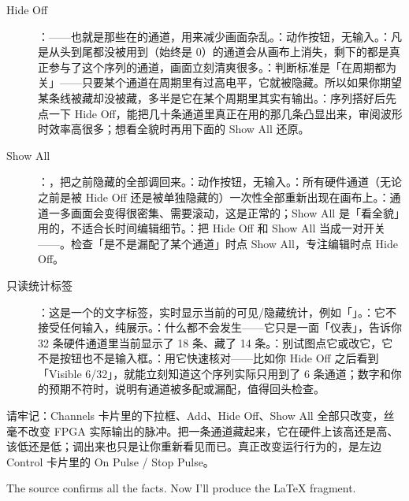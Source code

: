 \documentclass[11pt,oneside,openany]{book}
\begin{document}
\begin{description}
\item[Hide Off] ：——也就是那些在的通道，用来减少画面杂乱。：动作按钮，无输入。：凡是从头到尾都没被用到（始终是 0）的通道会从画布上消失，剩下的都是真正参与了这个序列的通道，画面立刻清爽很多。：判断标准是「在周期都为关」——只要某个通道在周期里有过高电平，它就被隐藏。所以如果你期望某条线被藏却没被藏，多半是它在某个周期里其实有输出。：序列搭好后先点一下 Hide Off，能把几十条通道里真正在用的那几条凸显出来，审阅波形时效率高很多；想看全貌时再用下面的 Show All 还原。

\item[Show All] ：，把之前隐藏的全部调回来。：动作按钮，无输入。：所有硬件通道（无论之前是被 Hide Off 还是被单独隐藏的）一次性全部重新出现在画布上。：通道一多画面会变得很密集、需要滚动，这是正常的；Show All 是「看全貌」用的，不适合长时间编辑细节。：把 Hide Off 和 Show All 当成一对开关——。检查「是不是漏配了某个通道」时点 Show All，专注编辑时点 Hide Off。

\item[只读统计标签] ：这是一个的文字标签，实时显示当前的可见/隐藏统计，例如「」。：它不接受任何输入，纯展示。：什么都不会发生——它只是一面「仪表」，告诉你 32 条硬件通道里当前显示了 18 条、藏了 14 条。：别试图点它或改它，它不是按钮也不是输入框。：用它快速核对——比如你 Hide Off 之后看到「Visible 6/32」，就能立刻知道这个序列实际只用到了 6 条通道；数字和你的预期不符时，说明有通道被多配或漏配，值得回头检查。
\end{description}

\begin{notebox}
请牢记：Channels 卡片里的下拉框、Add、Hide Off、Show All 全部只改变，丝毫不改变 FPGA 实际输出的脉冲。把一条通道藏起来，它在硬件上该高还是高、该低还是低；调出来也只是让你重新看见而已。真正改变运行行为的，是左边 Control 卡片里的 On Pulse / Stop Pulse。
\end{notebox}

The source confirms all the facts. Now I'll produce the LaTeX fragment.
\end{document}
